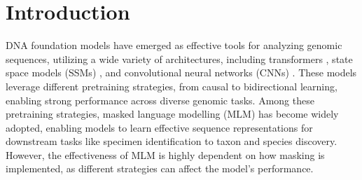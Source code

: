 \section{Introduction}


DNA foundation models have emerged as effective tools for analyzing genomic sequences, utilizing a wide variety of architectures, including transformers \citep{Zhou2021DNABERT,arias2023barcodebert, zhou2024dnaberts}, state space models (SSMs) \citep{poli2023hyena, gao2024barcodemambastatespacemodels}, and convolutional neural networks (CNNs) \citep{Banegas_2023}. These models leverage different pretraining strategies, from causal to bidirectional learning, enabling strong performance across diverse genomic tasks. Among these pretraining strategies, masked language modelling (MLM) has become widely adopted, enabling models to learn effective sequence representations for downstream tasks like specimen identification to taxon and species discovery. However, the effectiveness of MLM is highly dependent on how masking is implemented, as different strategies can affect the model's performance.

